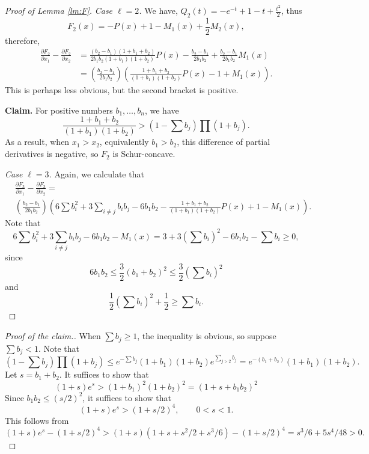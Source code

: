 \documentclass[10pt]{article}
\newcommand{\1}{\textbf{1}}
\theoremstyle{remark}
\theoremstyle{definition}
\begin{document}
\begin{proof}[Proof of Lemma \ref{lm:F}]
\emph{Case $\ell = 2$.}
We have, $Q_2(t) = -e^{-t} +1 - t + \frac{t^2}{2}$, thus
\[
F_2(x) = -P(x) + 1 - M_1(x) + \frac{1}{2}M_2(x),
\]
therefore,
\begin{align*}
\frac{\partial F_2}{\partial x_1} - \frac{\partial F_2}{\partial x_2} &= \frac{(b_2-b_1)(1+b_1+b_2)}{2b_1b_2(1+b_1)(1+b_2)}P(x) - \frac{b_2-b_1}{2b_1b_2} + \frac{b_2-b_1}{2b_1b_2}M_1(x)  \\
&=\left(\frac{b_2-b_1}{2b_1b_2}\right)\left(\frac{1+b_1+b_2}{(1+b_1)(1+b_2)}P(x)-1 + M_1(x)\right).
\end{align*}
This is perhaps less obvious, but the second bracket is positive.

\textbf{Claim.} For positive numbers $b_1, \dots, b_n$, we have
\[
\frac{1+b_1+b_2}{(1+b_1)(1+b_2)} > \left(1 - \sum b_j\right)\prod (1+b_j).
\]
As a result, when $x_1 > x_2$, equivalently $b_1 > b_2$, this difference of partial derivatives is negative, so $F_2$ is Schur-concave.

\emph{Case $\ell = 3$.} Again, we calculate that
\begin{align*}
	&\frac{\partial F_3}{\partial x_1} - \frac{\partial F_3}{\partial x_2}=\\ &\left(\frac{b_2-b_1}{2b_1b_2}\right)\left(6\sum b_i^2+3\sum_{i\neq j}b_ib_j-6b_1b_2-\frac{1+b_1+b_2}{(1+b_1)(1+b_2)}P(x)+1-M_1(x)\right).
\end{align*}
Note that $$6\sum b_i^2+3\sum_{i\neq j}b_ib_j-6b_1b_2-M_1(x)=3+3\left(\sum b_i\right)^2-6b_1b_2-\sum b_i\geq 0,$$
since $$6b_1b_2\leq\frac{3}{2}(b_1+b_2)^2\leq \frac{3}{2}(\sum b_i)^2$$ and 
$$\frac{1}{2}(\sum b_i)^2+\frac{1}{2}\geq\sum b_i.$$
\end{proof}



\begin{proof}[Proof of the claim.]
When $\sum b_j \geq 1$, the inequality is obvious, so suppose $\sum b_j  <1$. Note that
\[
\left(1 - \sum b_j\right)\prod (1+b_j) \leq e^{-\sum b_j}(1+b_1)(1+b_2)e^{\sum_{j>2} b_j} = e^{-(b_1+b_2)}(1+b_1)(1+b_2).
\]
Let $s = b_1 + b_2$. It suffices to show that
\[
(1+s)e^s > (1+b_1)^2(1+b_2)^2 = (1+s + b_1b_2)^2
\]
Since $b_1b_2 \leq (s/2)^2$, it suffices to show that
\[
(1+s)e^s > (1+s/2)^4, \qquad 0 < s  <1.
\]
This follows from
\[
(1+s)e^s - (1+s/2)^4 > (1+s)(1+s+s^2/2+s^3/6) - (1+s/2)^4 = s^3/6 + 5s^4/48 > 0.
\]
\end{proof}
\end{document}
